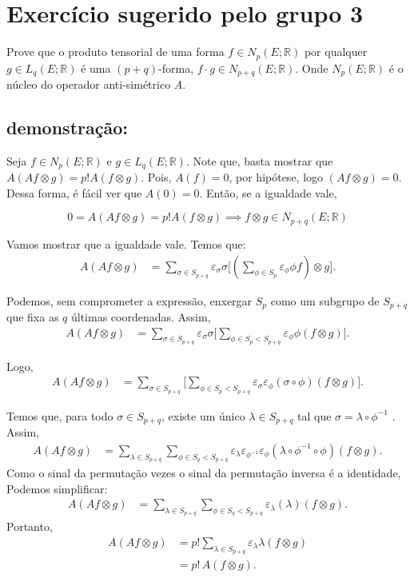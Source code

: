 \documentclass[11pt,a4paper]{article}
\newcommand{\sgn}{\varepsilon}
\theoremstyle{definition}
\theoremstyle{remark}
\begin{document}
\section*{Exercício sugerido pelo grupo 3}

Prove que o produto tensorial
de uma forma $f \in N_p(E;\mathbb{R})$ por qualquer $g \in L_q(E;\mathbb{R})$
é uma $(p+q)$-forma, $f \cdot g \in N_{p+q}(E;\mathbb{R})$. Onde $N_p(E;\mathbb{R})$ 
é o núcleo do operador anti-simétrico $A$. 
\subsection*{demonstração:}
Seja  $f \in N_p(E;\mathbb{R})$ e $g \in L_q(E;\mathbb{R})$.\newline
Note que, basta mostrar que $ A(Af \otimes g) = {p!} A(f \otimes g)$. Pois, $A(f)=0$,
por hipótese, logo $(Af \otimes g)=0$. Dessa forma, é fácil ver que $A(0)=0$. Então,
se a igualdade vale, 


\[
 0 = A(Af \otimes g) =  {p!} A(f \otimes g) \implies f \otimes g \in N_{p+q}(E;\mathbb{R})
\]

Vamos mostrar que a igualdade vale. Temos que:
\begin{align*}
A(Af \otimes g) 
&= \sum_{\sigma \in S_{p+q}} \sgn_{\sigma}\sigma
\Bigg[ (\sum_{\phi \in S_p} \sgn_{\phi} \phi f)\otimes g \Bigg].
\end{align*}

Podemos, sem comprometer a expressão, enxergar $S_p$ como um subgrupo de $S_{p+q}$ 
que fixa as $q$ últimas coordenadas. Assim,
\begin{align*}
A(Af \otimes g) 
&= \sum_{\sigma \in S_{p+q}} \sgn_{\sigma}\sigma 
\Bigg[ \sum_{\phi \in S_p < S_{p+q}}  \sgn_{\phi }\phi (f \otimes g) \Bigg].
\end{align*}

Logo,
\begin{align*}
A(Af \otimes g) 
&= \sum_{\sigma \in S_{p+q}} 
\Bigg[ \sum_{\phi \in S_p<S_{p+q}} \sgn_{\sigma} \sgn_{\phi }(\sigma \circ \phi) (f \otimes g) \Bigg].
\end{align*}

Temos que, para todo $\sigma \in S_{p+q}$, existe um único $\lambda \in S_{p+q}$ tal que 
$\sigma = \lambda \circ \phi^{-1}$ . Assim,
\begin{align*}
A(Af \otimes g) 
&= \sum_{\lambda \in S_{p+q}} \sum_{\phi \in S_q<S_{p+q}} 
\sgn_{\lambda} \sgn_{\phi^{-1}} \sgn_{\phi} (\lambda \circ \phi^{-1} \circ \phi)(f \otimes g).
\end{align*}
Como o sinal da permutação vezes o sinal da permutação inversa é a identidade, Podemos simplificar:
\begin{align*}
A(Af \otimes g) 
&= \sum_{\lambda \in S_{p+q}} \sum_{\phi \in S_q<S_{p+q}} 
\sgn_{\lambda}  (\lambda)(f \otimes g).
\end{align*}
Portanto,
\begin{align*}
A(Af \otimes g)
&= p! \sum_{\lambda \in S_{p+q}} \sgn_{\lambda}\lambda (f \otimes g) \\
&= p! \, A(f \otimes g).
\end{align*}
\end{document}
